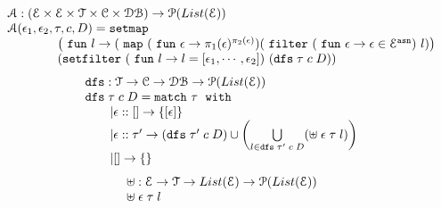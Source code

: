 \begin{defn}
\[
\begin{array}{l}
	\mathcal{A}:(\eventset \times \eventset \times \mathcal{T} \times \cdom \times \dbdom )\to \mathcal{P}(List(\eventset))
	\\
	\mathcal{A}(\event_1, \event_2, \trace, c, D) 
	= 
	\kw{setmap} ~
	\\ \qquad \qquad
	\left(\efun l \to ( \emap 
		(\efun  \event \to \pi_1(\event)^{\pi_2(\event)})
	(\efilter 
		(\efun \event \to  \event \in \eventset^{\asn}) ~ l) \right)
	\\ \qquad \qquad
	(\kw{setfilter} ~
		(\efun l \to l = [\event_1, \cdots, \event_2]) ~ (\kw{dfs} \eapp \trace \eapp c \eapp  D ))
	\end{array}
\]
%
%
\[
\begin{array}{l}
	\kw{dfs} : \mathcal{T} \to \cdom \to \dbdom \to \mathcal{P}(List(\eventset))
	\\
	\kw{dfs} \eapp \trace \eapp c \eapp  D
	= 
	\ematch~  \trace ~ \ewith
	\\ \qquad
	| \event :: {[]} \to \{[\event]\}
	\\ \qquad
	|  \event :: \trace' \to  
	(\kw{dfs} \eapp \trace'  \eapp c  \eapp D)
	\cup 
	\left(   \bigcup\limits_{l \in \kw{dfs} \eapp \trace' \eapp c \eapp  D }
	\left( \uplus \eapp  \event  \eapp \trace  \eapp l \right)
	\right)
	\\ \qquad
	| {[]}\to \{\}
\end{array}
\]
%
%
\[
\begin{array}{l}
	\uplus : \mathcal{E} \to \mathcal{T} \to List(\mathcal{E}) \to \mathcal{P}(List(\mathcal{E}))
	\\
	\uplus \;  \mathtt{\epsilon}  \; \mathtt{\tau}  \; l

\end{array}\]
\end{defn}
